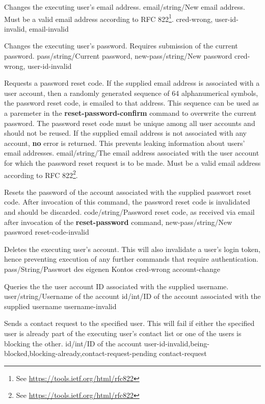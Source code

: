 \documentclass[parskip=full,11pt]{scrartcl}
\begin{document}
{Changes the executing user's email address.}
{email/string/New email address.
Must be a valid email address according to
RFC 822\footnote{See \url{https://tools.ietf.org/html/rfc822}}.}
{}
{cred-wrong, user-id-invalid, email-invalid}
{}

{Changes the executing user's password.
Requires submission of the current password.}
{pass/string/Current password,
new-pass/string/New password}
{}
{cred-wrong, user-id-invalid}
{}

{Requests a password reset code.
If the supplied email address is associated with a user account, then a
randomly generated sequence of 64 alphanumerical symbols, the password reset
code, is emailed to that address.
This sequence can be used as a paremeter in the \textbf{reset-password-confirm}
command to overwrite the current password.
The password reset code must be unique among all user accounts and should not
be reused.
If the supplied email address is not associated with any account, \textbf{no}
error is returned.
This prevents leaking information about users' email addresses.}
{email/string/The email address associated with the user account for which the
password reset request is to be made.
Must be a valid email address according to
RFC 822\footnote{See \url{https://tools.ietf.org/html/rfc822}}.}
{}
{}
{}

{Resets the password of the account associated with the supplied passwort reset
code.
After invocation of this command, the password reset code is invalidated and
should be discarded.}
{code/string/Password reset code{,} as received via email after invocation of
    the \textbf{reset-password} command,
new-pass/string/New password}
{}
{reset-code-invalid}
{}

{Deletes the executing user's account.
This will also invalidate a user's login token, hence preventing execution of
any further commands that require authentication.}
{pass/String/Passwort des eigenen Kontos}
{}
{cred-wrong}
{account-change}

{Queries the the user account ID associated with the supplied username.}
{user/string/Username of the account}
{id/int/ID of the account associated with the supplied username}
{username-invalid}
{}

{Sends a contact request to the specified user.
This will fail if either the specified user is already part of the executing
user's contact list or one of the users is blocking the other.}
{id/int/ID of the account}
{}
{user-id-invalid,being-blocked,blocking-already,contact-request-pending}
{contact-request}
\end{document}

